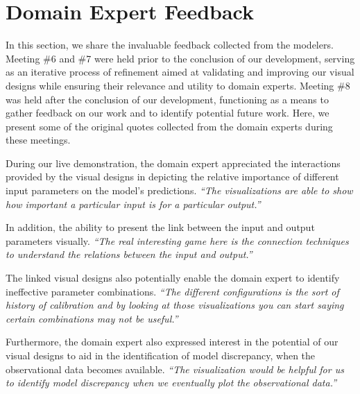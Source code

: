 \section{Domain Expert Feedback}
\label{sec:feedback}
In this section, we share the invaluable feedback collected from the modelers. 
Meeting \#6 and \#7 were held prior to the conclusion of our development, serving as an iterative process of refinement aimed at validating and improving our visual designs while ensuring their relevance and utility to domain experts.
Meeting \#8 was held after the conclusion of our development, functioning as a means to gather feedback on our work and to identify potential future work.
Here, we present some of the original quotes collected from the domain experts during these meetings.



During our live demonstration, the domain expert appreciated the interactions provided by the visual designs in depicting the relative importance of different input parameters on the model's predictions.
\textit{``The visualizations are able to show how important a particular input is for a particular output.''
    }

In addition, the ability to present the link between the input and output parameters visually.
\textit{``The real interesting game here is the connection techniques to understand the relations between the input and output.''
}

The linked visual designs also potentially enable the domain expert to identify ineffective parameter combinations.
\textit{``The different configurations is the sort of history of calibration and by looking at those visualizations you can start saying certain combinations may not be useful.''
}

Furthermore, the domain expert also expressed interest in the potential of our visual designs to aid in the identification of model discrepancy, when the observational data becomes available.
\textit{``The visualization would be helpful for us to identify model discrepancy when we eventually plot the observational data.''
}

